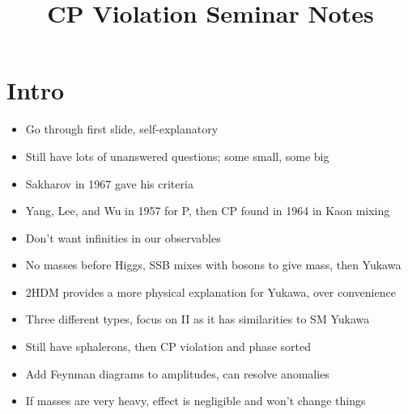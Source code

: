 \documentclass[12pt,a5paper]{article}
\title{\vspace{-3em}CP Violation Seminar Notes}
\author{}
\date{}
\begin{document}
\maketitle
\vspace{-4em}
\section{Intro}
\begin{itemize}
    \item Go through first slide, self-explanatory
    \item Still have lots of unanswered questions; some small, some big
    \item Sakharov in 1967 gave his criteria
    \item Yang, Lee, and Wu in 1957 for P, then CP found in 1964 in Kaon mixing
    \item Don't want infinities in our observables
    \item No masses before Higgs, SSB mixes with bosons to give mass, then Yukawa
    \item 2HDM provides a more physical explanation for Yukawa, over convenience
    \item Three different types, focus on II as it has similarities to SM Yukawa
    \item Still have sphalerons, then CP violation and phase sorted
    \item Add Feynman diagrams to amplitudes, can resolve anomalies
    \item If masses are very heavy, effect is negligible and won't change things
\end{itemize}
\end{document}
